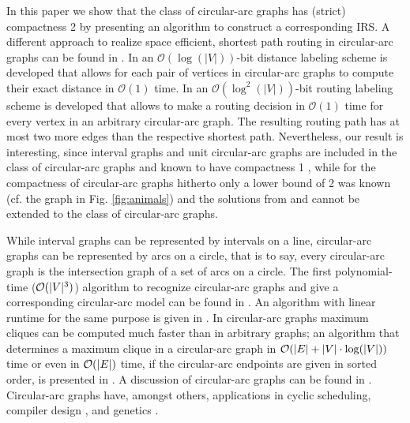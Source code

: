 \documentclass[10pt]{article}
\begin{document}
In this paper we show that the class of circular-arc graphs has (strict) compactness 2 
by presenting an algorithm to construct a corresponding IRS. A different approach to realize 
space efficient, shortest path routing in circular-arc graphs can be found 
in \cite{f.dragan:new}. In \cite{GP08} an $\mathcal{O}(\log(|V|))$-bit distance
labeling scheme is developed that allows for each pair of vertices in circular-arc graphs to
compute their exact distance in $\mathcal{O}(1)$ time.
In \cite{DYL06} an $\mathcal{O}(\log^2(|V|))$-bit routing labeling scheme is developed that allows 
to make a routing decision in  $\mathcal{O}(1)$ time for every vertex in an arbitrary circular-arc graph. 
The resulting routing path has at most two more edges than the respective shortest path.
Nevertheless, our result is interesting, since interval graphs and 
unit circular-arc graphs  are included in the class of circular-arc graphs and known to have 
compactness 1 \cite{FG98,NS96}, while for the compactness of circular-arc graphs hitherto 
only a lower bound of 2 was known (cf. the graph in Fig. \ref{fig:animals}) 
and the solutions from  \cite{FG98} and \cite{NS96} 
cannot be extended to the class of circular-arc graphs.
   
While interval graphs can be represented by intervals on a line, circular-arc graphs can be 
represented by arcs on a circle, that is to say, every circular-arc graph is the intersection 
graph of a set of arcs on a circle.
The first polynomial-time ($\mathcal{O}(|V|^3)$) algorithm 
to recognize circular-arc graphs and give a corresponding  circular-arc model can be found 
in \cite{firstCAG}. An algorithm with linear runtime for the same purpose is given 
in \cite{MCC03}. In circular-arc graphs maximum cliques can 
be computed much faster than in arbitrary graphs; an algorithm that determines a maximum 
clique in a circular-arc graph in $\mathcal{O}(|E|+|V|\cdot\log(|V|))$ time or even in $\mathcal{O}(|E|)$ time, 
if the circular-arc endpoints are given in sorted order, is presented 
in \cite{Bhattacharya1997336}. A discussion of circular-arc graphs can be found 
in \cite{Hsu95}. Circular-arc graphs have, amongst others, applications 
in cyclic scheduling, compiler design \cite{Gol04,tucker:493}, 
and genetics \cite{Rob76}.
\end{document}
